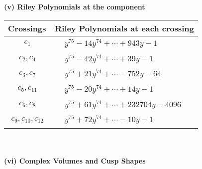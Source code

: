 \documentclass[1p]{elsarticle_modified}
\theoremstyle{definition}
\begin{document}
\newpage\renewcommand{\arraystretch}{1}
\flushleft \textbf{(v) Riley Polynomials at the component}\newline \\
\begin{tabular}{m{50pt}|m{274pt}}
Crossings & \hspace{64pt}Riley Polynomials at each crossing \\
\hline $$\begin{aligned}c_{1}\end{aligned}$$&$\begin{aligned}
&y^{75}-14 y^{74}+\cdots+943 y-1
\end{aligned}$\\
\hline $$\begin{aligned}c_{2},c_{4}\end{aligned}$$&$\begin{aligned}
&y^{75}-42 y^{74}+\cdots+39 y-1
\end{aligned}$\\
\hline $$\begin{aligned}c_{3},c_{7}\end{aligned}$$&$\begin{aligned}
&y^{75}+21 y^{74}+\cdots-752 y-64
\end{aligned}$\\
\hline $$\begin{aligned}c_{5},c_{11}\end{aligned}$$&$\begin{aligned}
&y^{75}-20 y^{74}+\cdots+14 y-1
\end{aligned}$\\
\hline $$\begin{aligned}c_{6},c_{8}\end{aligned}$$&$\begin{aligned}
&y^{75}+61 y^{74}+\cdots+232704 y-4096
\end{aligned}$\\
\hline $$\begin{aligned}c_{9},c_{10},c_{12}\end{aligned}$$&$\begin{aligned}
&y^{75}+72 y^{74}+\cdots-10 y-1
\end{aligned}$\\
\hline
\end{tabular}\\~\\
\newpage\flushleft \textbf{(vi) Complex Volumes and Cusp Shapes}
\end{document}
